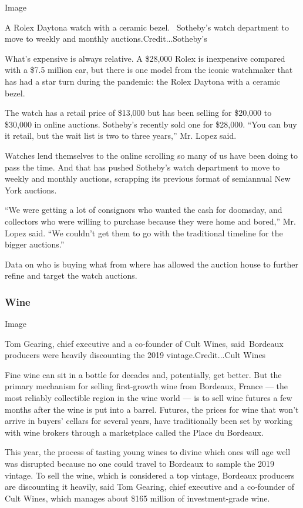 Image

A Rolex Daytona watch with a ceramic bezel.~ Sotheby's watch department
to move to weekly and monthly auctions.Credit...Sotheby's

What's expensive is always relative. A \$28,000 Rolex is inexpensive
compared with a \$7.5 million car, but there is one model from the
iconic watchmaker that has had a star turn during the pandemic: the
Rolex Daytona with a ceramic bezel.

The watch has a retail price of \$13,000 but has been selling for
\$20,000 to \$30,000 in online auctions. Sotheby's recently sold one for
\$28,000. ``You can buy it retail, but the wait list is two to three
years,'' Mr. Lopez said.

Watches lend themselves to the online scrolling so many of us have been
doing to pass the time. And that has pushed Sotheby's watch department
to move to weekly and monthly auctions, scrapping its previous format of
semiannual New York auctions.

``We were getting a lot of consignors who wanted the cash for doomsday,
and collectors who were willing to purchase because they were home and
bored,'' Mr. Lopez said. ``We couldn't get them to go with the
traditional timeline for the bigger auctions.''

Data on who is buying what from where has allowed the auction house to
further refine and target the watch auctions.

\hypertarget{wine}{%
\subsubsection{\texorpdfstring{\textbf{Wine}}{Wine}}\label{wine}}

Image

Tom Gearing, chief executive and a co-founder of Cult Wines,
said~Bordeaux producers were heavily discounting the 2019
vintage.Credit...Cult Wines

Fine wine can sit in a bottle for decades and, potentially, get better.
But the primary mechanism for selling first-growth wine from Bordeaux,
France --- the most reliably collectible region in the wine world --- is
to sell wine futures a few months after the wine is put into a barrel.
Futures, the prices for wine that won't arrive in buyers' cellars for
several years, have traditionally been set by working with wine brokers
through a marketplace called the Place du Bordeaux.

This year, the process of tasting young wines to divine which ones will
age well was disrupted because no one could travel to Bordeaux to sample
the 2019 vintage. To sell the wine, which is considered a top vintage,
Bordeaux producers are discounting it heavily, said Tom Gearing, chief
executive and a co-founder of Cult Wines, which manages about \$165
million of investment-grade wine.

